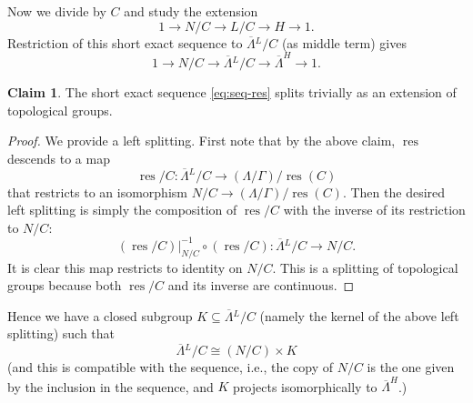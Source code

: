 \documentclass[11pt]{article}
\newcommand{\ie}{i.e.,\xspace}
\numberwithin{equation}{section}\providecommand{\llangle}{\langle\!\langle}\providecommand{\rrangle}{\rangle\!\rangle}\providecommand{\Asterisk}{\ast}
\newcommand{\oLL}{\ensuremath{\overline{\Lambda}{}^L}}
\DeclareMathOperator{\res}{res}
\theoremstyle{definition}
\newtheorem{claim}[thm]{Claim}
\begin{document}
Now we divide by $C$ and study the extension
\[
1\to N/C \to L/C \to H\to 1.
\]
Restriction of this short exact sequence to $\oLL/C$ (as middle term) gives
\begin{equation}\label{eq:seq-res}
1\to N/C \to \oLL/C\to \overline{\Lambda}^{H}\to 1.
\end{equation}
\begin{claim}\label{claim:l-split}
The short exact sequence \eqref{eq:seq-res} splits trivially as an extension of topological groups.
\end{claim}
\begin{proof} We provide a left splitting. First note that by the above claim, $\res$ descends to a map
\[
\res/C : \oLL/C\to (\Lambda/\Gamma)/\res(C)
\]
that restricts to an isomorphism $N/C\to (\Lambda/\Gamma)/\res(C)$. Then the desired left splitting is simply the composition of $\res/C$ with the inverse of its restriction to $N/C$:
\[
(\res/C)|_{N/C}^{-1} \circ (\res/C): \oLL/C\longrightarrow N/C.
\]
It is clear this map restricts to identity on $N/C$. This is a splitting of topological groups because both $\res/C$ and its inverse are continuous.\end{proof}
Hence we have a closed subgroup $K\subseteq \oLL/C$ (namely the kernel of the above left splitting) such that
\[
\oLL/C\cong (N/C) \times K
\]
(and this is compatible with the sequence, \ie the copy of $N/C$ is the one given by the inclusion in the sequence, and $K$ projects isomorphically to $\overline{\Lambda}^{H}$.)
\end{document}
